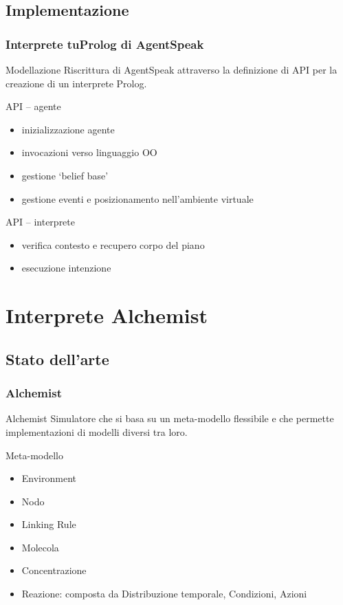 \documentclass[handout]{beamer}\mode<presentation>{\usetheme{AMSCesenaBleu}}
\begin{document}
\subsection{Implementazione}
\begin{frame}
\frametitle{Interprete tuProlog di AgentSpeak}
\begin{block}{Modellazione}
Riscrittura di AgentSpeak attraverso la definizione di API per la creazione di un interprete Prolog.
\end{block}

\begin{block}{API -- agente}
\begin{itemize}
\item inizializzazione agente
\item invocazioni verso linguaggio OO
\item gestione `belief base'
\item gestione eventi e posizionamento nell'ambiente virtuale
\end{itemize}
\end{block}

\begin{block}{API -- interprete}
\begin{itemize}
\item verifica contesto e recupero corpo del piano
\item esecuzione intenzione
\end{itemize}
\end{block}
\end{frame}



\section{Interprete Alchemist}

\subsection{Stato dell'arte}
\begin{frame}
\frametitle{Alchemist}
\begin{block}{Alchemist}
Simulatore che si basa su un meta-modello flessibile e che permette implementazioni di modelli diversi tra loro.
\end{block}
\begin{block}{Meta-modello}
\begin{itemize}
\item Environment
\item Nodo
\item Linking Rule
\item Molecola
\item Concentrazione
\item Reazione: composta da Distribuzione temporale, Condizioni, Azioni
\end{itemize}
\end{block}
\end{frame}
\end{document}

